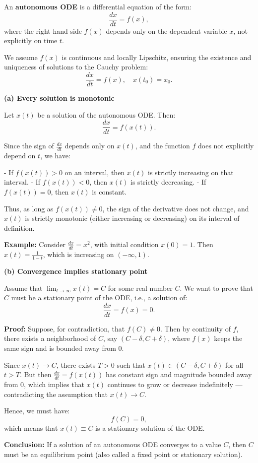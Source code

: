 
An \textbf{autonomous ODE} is a differential equation of the form:
\[
\frac{dx}{dt} = f(x),
\]
where the right-hand side \( f(x) \) depends only on the dependent variable \( x \), not explicitly on time \( t \).

We assume \( f(x) \) is continuous and locally Lipschitz, ensuring the existence and uniqueness of solutions to the Cauchy problem:
\[
\frac{dx}{dt} = f(x), \quad x(t_0) = x_0.
\]

\vspace{1em}
\noindent
\textbf{(a) Every solution is monotonic}

Let \( x(t) \) be a solution of the autonomous ODE. Then:
\[
\frac{dx}{dt} = f(x(t)).
\]

Since the sign of \( \frac{dx}{dt} \) depends only on \( x(t) \), and the function \( f \) does not explicitly depend on \( t \), we have:

- If \( f(x(t)) > 0 \) on an interval, then \( x(t) \) is strictly increasing on that interval.
- If \( f(x(t)) < 0 \), then \( x(t) \) is strictly decreasing.
- If \( f(x(t)) = 0 \), then \( x(t) \) is constant.

Thus, as long as \( f(x(t)) \neq 0 \), the sign of the derivative does not change, and \( x(t) \) is strictly monotonic (either increasing or decreasing) on its interval of definition.

\textbf{Example:}  
Consider \( \frac{dx}{dt} = x^2 \), with initial condition \( x(0) = 1 \).  
Then \( x(t) = \frac{1}{1 - t} \), which is increasing on \( (-\infty, 1) \).

\vspace{1em}
\noindent
\textbf{(b) Convergence implies stationary point}

Assume that \( \displaystyle \lim_{t \to \infty} x(t) = C \) for some real number \( C \).  
We want to prove that \( C \) must be a stationary point of the ODE, i.e., a solution of:
\[
\frac{dx}{dt} = f(x) = 0.
\]

\textbf{Proof:}  
Suppose, for contradiction, that \( f(C) \neq 0 \).  
Then by continuity of \( f \), there exists a neighborhood of \( C \), say \( (C - \delta, C + \delta) \), where \( f(x) \) keeps the same sign and is bounded away from 0.

Since \( x(t) \to C \), there exists \( T > 0 \) such that \( x(t) \in (C - \delta, C + \delta) \) for all \( t > T \).  
But then \( \frac{dx}{dt} = f(x(t)) \) has constant sign and magnitude bounded away from 0, which implies that \( x(t) \) continues to grow or decrease indefinitely — contradicting the assumption that \( x(t) \to C \).

Hence, we must have:
\[
f(C) = 0,
\]
which means that \( x(t) \equiv C \) is a stationary solution of the ODE.

\textbf{Conclusion:}  
If a solution of an autonomous ODE converges to a value \( C \), then \( C \) must be an equilibrium point (also called a fixed point or stationary solution).